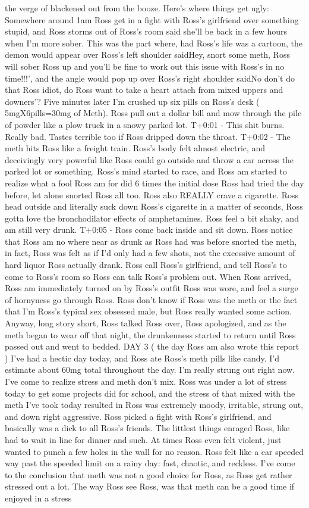 \documentclass[12pt]{book}
\begin{document}
the verge of blackened out from the booze. Here's where things get ugly: Somewhere around 1am Ross get in a fight with Ross's girlfriend over something stupid, and Ross storms out of Ross's room said she'll be back in a few hours when I'm more sober. This was the part where, had Ross's life was a cartoon, the demon would appear over Ross's left shoulder saidHey, snort some meth, Ross will sober Ross up and you'll be fine to work out this issue with Ross's in no time!!!', and the angle would pop up over Ross's right shoulder saidNo don't do that Ross idiot, do Ross want to take a heart attach from mixed uppers and downers'? Five minutes later I'm crushed up six pills on Ross's desk ( 5mgX6pills=30mg of Meth). Ross pull out a dollar bill and mow through the pile of powder like a plow truck in a snowy parked lot. T+0:01 - This shit burns. Really bad. Tastes terrible too if Ross dripped down the throat. T+0:02 - The meth hits Ross like a freight train. Ross's body felt almost electric, and deceivingly very powerful like Ross could go outside and throw a car across the parked lot or something. Ross's mind started to race, and Ross am started to realize what a fool Ross am for did 6 times the initial dose Ross had tried the day before, let alone snorted Ross all too. Ross also REALLY crave a cigarette. Ross head outside and literally suck down Ross's cigarette in a matter of seconds, Ross gotta love the bronchodilator effects of amphetamines. Ross feel a bit shaky, and am still very drunk. T+0:05 - Ross come back inside and sit down. Ross notice that Ross am no where near as drunk as Ross had was before snorted the meth, in fact, Ross was felt as if I'd only had a few shots, not the excessive amount of hard liquor Ross actually drank. Ross call Ross's girlfriend, and tell Ross's to come to Ross's room so Ross can talk Ross's problem out. When Ross arrived, Ross am immediately turned on by Ross's outfit Ross was wore, and feel a surge of hornyness go through Ross. Ross don't know if Ross was the meth or the fact that I'm Ross's typical sex obsessed male, but Ross really wanted some action. Anyway, long story short, Ross talked Ross over, Ross apologized, and as the meth began to wear off that night, the drunkenness started to return until Ross passed out and went to bedded. DAY 3 ( the day Ross am also wrote this report ) I've had a hectic day today, and Ross ate Ross's meth pills like candy. I'd estimate about 60mg total throughout the day. I'm really strung out right now. I've come to realize stress and meth don't mix. Ross was under a lot of stress today to get some projects did for school, and the stress of that mixed with the meth I've took today resulted in Ross was extremely moody, irritable, strung out, and down right aggressive. Ross picked a fight with Ross's girlfriend, and basically was a dick to all Ross's friends. The littlest things enraged Ross, like had to wait in line for dinner and such. At times Ross even felt violent, just wanted to punch a few holes in the wall for no reason. Ross felt like a car speeded way past the speeded limit on a rainy day: fast, chaotic, and reckless. I've come to the conclusion that meth was not a good choice for Ross, as Ross get rather stressed out a lot. The way Ross see Ross, was that meth can be a good time if enjoyed in a stress 
\end{document}
